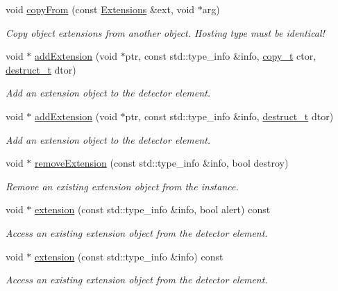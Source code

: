 \begin{DoxyCompactItemize}
void \hyperlink{class_d_d4hep_1_1_object_extensions_a45c52f32737b70516b0ee96ddd3e14be}{copy\+From} (const \hyperlink{class_d_d4hep_1_1_object_extensions_a882c1e22567a450f60d83eb735dd3532}{Extensions} \&ext, void $\ast$arg)
\begin{DoxyCompactList}\small\item\em Copy object extensions from another object. Hosting type must be identical! \end{DoxyCompactList}\item 
void $\ast$ \hyperlink{class_d_d4hep_1_1_object_extensions_acfe9fe435a30ca5fedd0678b867732a0}{add\+Extension} (void $\ast$ptr, const std\+::type\+\_\+info \&info, \hyperlink{class_d_d4hep_1_1_object_extensions_afb8207da7e2d6d5e3018cc7b5c997f6d}{copy\+\_\+t} ctor, \hyperlink{class_d_d4hep_1_1_object_extensions_a705a3524f9097577069a83993a39a9b2}{destruct\+\_\+t} dtor)
\begin{DoxyCompactList}\small\item\em Add an extension object to the detector element. \end{DoxyCompactList}\item 
void $\ast$ \hyperlink{class_d_d4hep_1_1_object_extensions_a9e4010c2b9cbfda1455c10821a3cae85}{add\+Extension} (void $\ast$ptr, const std\+::type\+\_\+info \&info, \hyperlink{class_d_d4hep_1_1_object_extensions_a705a3524f9097577069a83993a39a9b2}{destruct\+\_\+t} dtor)
\begin{DoxyCompactList}\small\item\em Add an extension object to the detector element. \end{DoxyCompactList}\item 
void $\ast$ \hyperlink{class_d_d4hep_1_1_object_extensions_a4ee557d0bcce3b57dd6f462a6967dd6b}{remove\+Extension} (const std\+::type\+\_\+info \&info, bool destroy)
\begin{DoxyCompactList}\small\item\em Remove an existing extension object from the instance. \end{DoxyCompactList}\item 
void $\ast$ \hyperlink{class_d_d4hep_1_1_object_extensions_a99f915911010e0c716938e3ec848ff7b}{extension} (const std\+::type\+\_\+info \&info, bool alert) const
\begin{DoxyCompactList}\small\item\em Access an existing extension object from the detector element. \end{DoxyCompactList}\item 
void $\ast$ \hyperlink{class_d_d4hep_1_1_object_extensions_a61c801252545f49ea1e0af177e7016eb}{extension} (const std\+::type\+\_\+info \&info) const
\begin{DoxyCompactList}\small\item\em Access an existing extension object from the detector element. \end{DoxyCompactList}\end{DoxyCompactItemize}
